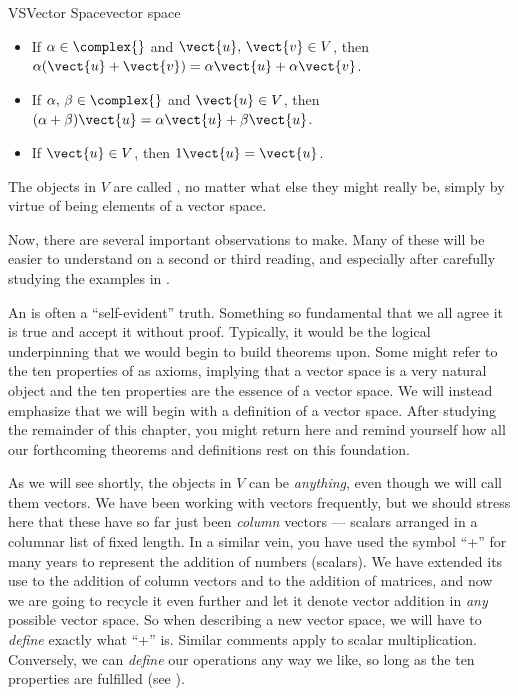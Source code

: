 \begin{definition}{VS}{Vector Space}{vector space}
\begin{itemize}
%
\item{}
If $\alpha\in\complex{\null}$ and $\vect{u},\,\vect{v}\in V$, then $\alpha(\vect{u}+\vect{v})=\alpha\vect{u}+\alpha\vect{v}$.
%
\item{}
If $\alpha,\,\beta\in\complex{\null}$ and $\vect{u}\in V$, then
$(\alpha+\beta)\vect{u}=\alpha\vect{u}+\beta\vect{u}$.
%
\item{}
If $\vect{u}\in V$, then $1\vect{u}=\vect{u}$.
%
\end{itemize}
%
The objects in $V$ are called , no matter what else they might really be, simply by virtue of being elements of a vector space.
\end{definition}
%
Now, there are several important observations to make.  Many of these will be easier to understand on a second or third reading, and especially after carefully studying the examples in .\par
%
An  is often a ``self-evident'' truth.  Something so fundamental that we all agree it is true and accept it without proof.  Typically, it would be the logical underpinning that we would begin to build theorems upon.  Some might refer to the ten properties of  as axioms, implying that a vector space is a very natural object and the ten properties are the essence of a vector space.  We will instead emphasize that we will begin with a definition of a vector space.   After studying the remainder of this chapter, you might return here and remind yourself how all our forthcoming theorems and definitions rest on this foundation.\par
%
As we will see shortly, the objects in $V$ can be {\em anything}, even though we will call them vectors.  We have been working with vectors frequently, but we should stress here that these have so far just been {\em column} vectors --- scalars arranged in a columnar list of fixed length.  In a similar vein, you have used the symbol ``+'' for many years to represent the addition of numbers (scalars).  We have extended its use to the addition of column vectors and to the addition of matrices, and now we are going to recycle it even further and let it denote vector addition in {\em any} possible vector space.  So when describing a new vector space, we will have to {\em define} exactly what ``+'' is.  Similar comments apply to scalar multiplication.  Conversely, we can {\em define} our operations any way we like, so long as the ten properties are fulfilled (see ).\par
